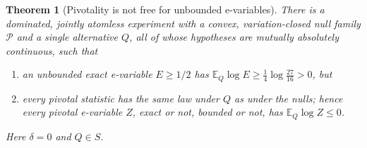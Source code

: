 \documentclass[11pt,a4paper]{article}
\newtheorem{theorem}{Theorem}[section]
\theoremstyle{definition}
\theoremstyle{remark}
\newcommand{\PP}{\mathcal P}
\newcommand{\EE}{\mathbb E}
\begin{document}
\begin{theorem}[Pivotality is not free for unbounded e-variables]\label{thm:notfree}
There is a dominated, jointly atomless experiment with a convex, variation-closed null family \(\PP\) and a single alternative \(Q\), all of whose hypotheses are mutually absolutely continuous, such that
\begin{enumerate}[label=(\alph*)]
\item an unbounded exact e-variable \(E\ge1/2\) has \(\EE_Q\log E\ge\tfrac14\log\tfrac{27}{16}>0\), but
\item every pivotal statistic has the same law under \(Q\) as under the nulls; hence every pivotal e-variable \(Z\), exact or not, bounded or not, has \(\EE_Q\log Z\le0\).
\end{enumerate}
Here \(\delta=0\) and \(Q\in S\).
\end{theorem}
\end{document}
